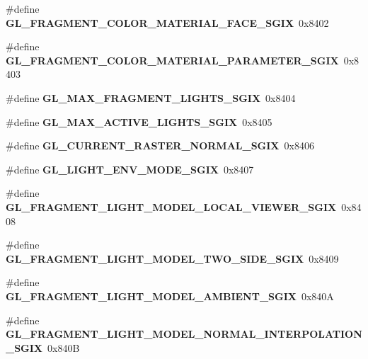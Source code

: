 \begin{DoxyCompactItemize}
\item 
\#define {\bfseries G\+L\+\_\+\+F\+R\+A\+G\+M\+E\+N\+T\+\_\+\+C\+O\+L\+O\+R\+\_\+\+M\+A\+T\+E\+R\+I\+A\+L\+\_\+\+F\+A\+C\+E\+\_\+\+S\+G\+I\+X}~0x8402\label{_s_d_l__opengl_8h_aa62f0c6558977834352e1034157b02ed}

\item 
\#define {\bfseries G\+L\+\_\+\+F\+R\+A\+G\+M\+E\+N\+T\+\_\+\+C\+O\+L\+O\+R\+\_\+\+M\+A\+T\+E\+R\+I\+A\+L\+\_\+\+P\+A\+R\+A\+M\+E\+T\+E\+R\+\_\+\+S\+G\+I\+X}~0x8403\label{_s_d_l__opengl_8h_a808b673ee618df74ca5134c2578d03f1}

\item 
\#define {\bfseries G\+L\+\_\+\+M\+A\+X\+\_\+\+F\+R\+A\+G\+M\+E\+N\+T\+\_\+\+L\+I\+G\+H\+T\+S\+\_\+\+S\+G\+I\+X}~0x8404\label{_s_d_l__opengl_8h_a8d2ee309cf0807c7d53d7f3f4c652170}

\item 
\#define {\bfseries G\+L\+\_\+\+M\+A\+X\+\_\+\+A\+C\+T\+I\+V\+E\+\_\+\+L\+I\+G\+H\+T\+S\+\_\+\+S\+G\+I\+X}~0x8405\label{_s_d_l__opengl_8h_a0c3985dbc391d68a2707c1d9c3d39677}

\item 
\#define {\bfseries G\+L\+\_\+\+C\+U\+R\+R\+E\+N\+T\+\_\+\+R\+A\+S\+T\+E\+R\+\_\+\+N\+O\+R\+M\+A\+L\+\_\+\+S\+G\+I\+X}~0x8406\label{_s_d_l__opengl_8h_a7d11ea01a40b36021ee01d8a7b29a5ea}

\item 
\#define {\bfseries G\+L\+\_\+\+L\+I\+G\+H\+T\+\_\+\+E\+N\+V\+\_\+\+M\+O\+D\+E\+\_\+\+S\+G\+I\+X}~0x8407\label{_s_d_l__opengl_8h_a0e667a6a846cb576118b2753402c7352}

\item 
\#define {\bfseries G\+L\+\_\+\+F\+R\+A\+G\+M\+E\+N\+T\+\_\+\+L\+I\+G\+H\+T\+\_\+\+M\+O\+D\+E\+L\+\_\+\+L\+O\+C\+A\+L\+\_\+\+V\+I\+E\+W\+E\+R\+\_\+\+S\+G\+I\+X}~0x8408\label{_s_d_l__opengl_8h_add9c3faacad3559696afef158935fe32}

\item 
\#define {\bfseries G\+L\+\_\+\+F\+R\+A\+G\+M\+E\+N\+T\+\_\+\+L\+I\+G\+H\+T\+\_\+\+M\+O\+D\+E\+L\+\_\+\+T\+W\+O\+\_\+\+S\+I\+D\+E\+\_\+\+S\+G\+I\+X}~0x8409\label{_s_d_l__opengl_8h_ae2981877c8b88da8514758bd269fd5f5}

\item 
\#define {\bfseries G\+L\+\_\+\+F\+R\+A\+G\+M\+E\+N\+T\+\_\+\+L\+I\+G\+H\+T\+\_\+\+M\+O\+D\+E\+L\+\_\+\+A\+M\+B\+I\+E\+N\+T\+\_\+\+S\+G\+I\+X}~0x840\+A\label{_s_d_l__opengl_8h_a11e892c73fb8de4205bcc219988e755a}

\item 
\#define {\bfseries G\+L\+\_\+\+F\+R\+A\+G\+M\+E\+N\+T\+\_\+\+L\+I\+G\+H\+T\+\_\+\+M\+O\+D\+E\+L\+\_\+\+N\+O\+R\+M\+A\+L\+\_\+\+I\+N\+T\+E\+R\+P\+O\+L\+A\+T\+I\+O\+N\+\_\+\+S\+G\+I\+X}~0x840\+B\label{_s_d_l__opengl_8h_ad0460ad4142bc7fc6e24f2f8afb5050b}


\end{DoxyCompactItemize}
